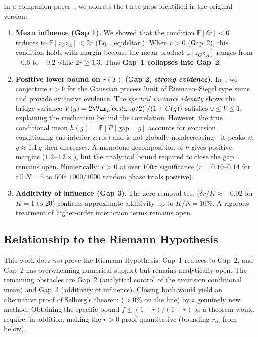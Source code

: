 \documentclass[11pt,a4paper]{article}
\begin{document}
In a companion paper~\cite{RPosThm}, we address the three gaps identified in the original version:

\begin{enumerate}
\item \textbf{Mean influence (Gap 1).}
We showed that the condition $\mathbb{E}[\delta r] < 0$ reduces to
$\mathbb{E}[z_G z_A] < 2r$ (Eq.~\ref{eq:deltar}).
When $r > 0$ (Gap~2), this condition holds with margin
because the mean product $\mathbb{E}[z_G z_A]$ ranges from $-0.6$ to $-0.2$
while $2r \geq 1.3$.
Thus \textbf{Gap~1 collapses into Gap~2}.

\item \textbf{Positive lower bound on $r(T)$ (Gap 2, \emph{strong evidence}).}
In~\cite{RPosThm}, we conjecture $r > 0$ for the Gaussian process limit
of Riemann--Siegel type sums and provide extensive evidence.
The \emph{spectral variance identity} shows the bridge variance
$V(g) = 2\Var_p[\cos(\omega_n g/2)]/(1+C(g))$ satisfies $0 \leq V \leq 1$,
explaining the mechanism behind the correlation.
However, the true conditional mean $h(g) = \mathbb{E}[P \mid \text{gap}=g]$
accounts for excursion conditioning (no interior zeros) and is not globally
nondecreasing---it peaks at $g \approx 1.1\,\bar{g}$ then decreases.
A monotone decomposition of $h$ gives positive margins ($1.2$--$1.3\times$),
but the analytical bound required to close the gap remains open.
Numerically: $r > 0$ at over $100\sigma$ significance ($r = 0.10$--$0.14$
for all $N = 5$ to $500$; $1000/1000$ random phase trials positive).

\item \textbf{Additivity of influence (Gap 3).}
The zero-removal test ($\delta r / K \approx -0.02$ for $K = 1$ to $20$) confirms
approximate additivity up to $K/N = 10\%$.
A rigorous treatment of higher-order interaction terms remains open.
\end{enumerate}

\subsection{Relationship to the Riemann Hypothesis}

This work does \emph{not} prove the Riemann Hypothesis.
Gap~1 reduces to Gap~2, and Gap~2 has overwhelming numerical support
but remains analytically open.
The remaining obstacles are Gap~2 (analytical control of the excursion
conditional mean) and Gap~3 (additivity of influence).
Closing both would yield an alternative proof of Selberg's theorem
($> 0\%$ on the line) by a genuinely new method.
Obtaining the specific bound $f \leq (1{-}r)/(1{+}r)$ as a theorem
would require, in addition, making the $r > 0$ proof quantitative (bounding $r_\infty$ from below).
\end{document}
